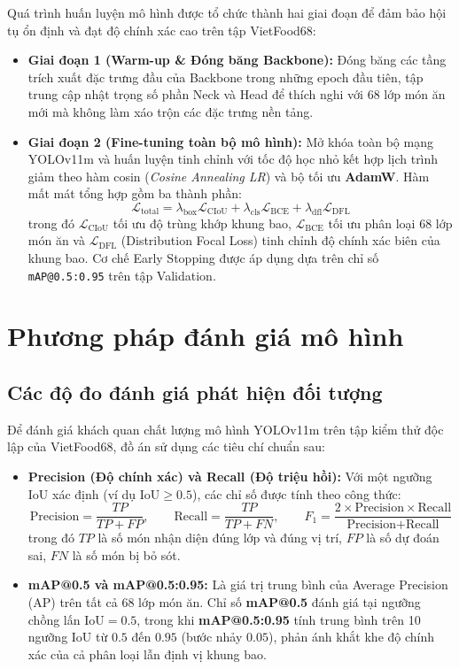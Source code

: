 \documentclass[../main.tex]{subfiles}
\begin{document}
Quá trình huấn luyện mô hình được tổ chức thành hai giai đoạn để đảm bảo hội tụ ổn định và đạt độ chính xác cao trên tập VietFood68:
\begin{itemize}
    \item \textbf{Giai đoạn 1 (Warm-up \& Đóng băng Backbone):} Đóng băng các tầng trích xuất đặc trưng đầu của Backbone trong những epoch đầu tiên, tập trung cập nhật trọng số phần Neck và Head để thích nghi với 68 lớp món ăn mới mà không làm xáo trộn các đặc trưng nền tảng.
    \item \textbf{Giai đoạn 2 (Fine-tuning toàn bộ mô hình):} Mở khóa toàn bộ mạng YOLOv11m và huấn luyện tinh chỉnh với tốc độ học nhỏ kết hợp lịch trình giảm theo hàm cosin (\textit{Cosine Annealing LR}) và bộ tối ưu \textbf{AdamW}. Hàm mất mát tổng hợp gồm ba thành phần:
    \begin{equation}
        \mathcal{L}_{\text{total}} = \lambda_{\text{box}} \mathcal{L}_{\text{CIoU}} + \lambda_{\text{cls}} \mathcal{L}_{\text{BCE}} + \lambda_{\text{dfl}} \mathcal{L}_{\text{DFL}}
    \end{equation}
    trong đó $\mathcal{L}_{\text{CIoU}}$ tối ưu độ trùng khớp khung bao, $\mathcal{L}_{\text{BCE}}$ tối ưu phân loại 68 lớp món ăn và $\mathcal{L}_{\text{DFL}}$ (Distribution Focal Loss) tinh chỉnh độ chính xác biên của khung bao. Cơ chế Early Stopping được áp dụng dựa trên chỉ số \texttt{mAP@0.5:0.95} trên tập Validation.
\end{itemize}

\section{Phương pháp đánh giá mô hình}
\label{sec:2.4}

\subsection{Các độ đo đánh giá phát hiện đối tượng}

Để đánh giá khách quan chất lượng mô hình YOLOv11m trên tập kiểm thử độc lập của VietFood68, đồ án sử dụng các tiêu chí chuẩn sau:
\begin{itemize}
    \item \textbf{Precision (Độ chính xác) và Recall (Độ triệu hồi):} Với một ngưỡng IoU xác định (ví dụ $\text{IoU} \ge 0.5$), các chỉ số được tính theo công thức:
    \begin{equation}
        \text{Precision} = \frac{TP}{TP + FP}, \qquad \text{Recall} = \frac{TP}{TP + FN}, \qquad F_1 = \frac{2 \times \text{Precision} \times \text{Recall}}{\text{Precision} + \text{Recall}}
    \end{equation}
    trong đó $TP$ là số món nhận diện đúng lớp và đúng vị trí, $FP$ là số dự đoán sai, $FN$ là số món bị bỏ sót.
    \item \textbf{mAP@0.5 và mAP@0.5:0.95:} Là giá trị trung bình của Average Precision (AP) trên tất cả 68 lớp món ăn. Chỉ số \textbf{mAP@0.5} đánh giá tại ngưỡng chồng lấn $\text{IoU} = 0.5$, trong khi \textbf{mAP@0.5:0.95} tính trung bình trên 10 ngưỡng $\text{IoU}$ từ $0.5$ đến $0.95$ (bước nhảy $0.05$), phản ánh khắt khe độ chính xác của cả phân loại lẫn định vị khung bao.
\end{itemize}
\end{document}
